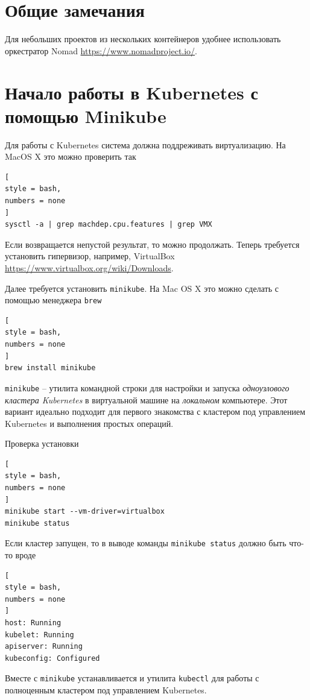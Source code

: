 \documentclass[%
	11pt,
	a4paper,
	utf8,
		]{article}
\begin{document}
\section{Общие замечания}

Для небольших проектов из нескольких контейнеров удобнее использовать оркестратор Nomad \url{https://www.nomadproject.io/}.


\section{Начало работы в Kubernetes с помощью Minikube}

Для работы с Kubernetes система должна поддреживать виртуализацию. На MacOS X это можно проверить так
\begin{lstlisting}[
style = bash,
numbers = none
]
sysctl -a | grep machdep.cpu.features | grep VMX
\end{lstlisting}

Если возвращается непустой результат, то можно продолжать. Теперь требуется установить гипервизор, например, VirtualBox \url{https://www.virtualbox.org/wiki/Downloads}.

Далее требуется установить \texttt{minikube}. На Mac OS X это можно сделать с помощью менеджера \texttt{brew}
\begin{lstlisting}[
style = bash,
numbers = none	
]
brew install minikube
\end{lstlisting}

\texttt{minikube} -- утилита командной строки для настройки и запуска \emph{одноузлового кластера Kubernetes} в виртуальной машине на \emph{локальном} компьютере. Этот вариант идеально подходит для первого знакомства с кластером под управлением Kubernetes и выполнения простых операций.

Проверка установки
\begin{lstlisting}[
style = bash,
numbers = none	
]
minikube start --vm-driver=virtualbox
minikube status
\end{lstlisting}

Если кластер запущен, то в выводе команды \texttt{minikube status} должно быть что-то вроде
\begin{lstlisting}[
style = bash,
numbers = none	
]
host: Running
kubelet: Running
apiserver: Running
kubeconfig: Configured
\end{lstlisting}

Вместе с \texttt{minikube} устанавливается и утилита \texttt{kubectl} для работы с полноценным кластером под управлением Kubernetes.
\end{document}
